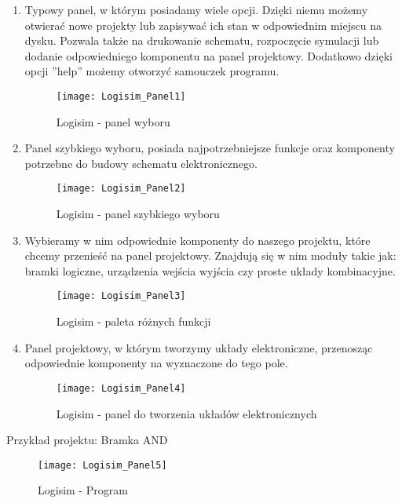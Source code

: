 \documentclass[12pt, a4paper, onside, polish]{article}				%
\begin{document}
 \begin{enumerate}
\item Typowy panel, w którym posiadamy wiele opcji. Dzięki niemu możemy otwierać nowe projekty lub zapisywać ich stan w odpowiednim miejscu na dysku. Pozwala także na drukowanie schematu, rozpoczęcie symulacji lub dodanie odpowiedniego komponentu na panel projektowy. Dodatkowo dzięki opcji ''help'' możemy otworzyć samouczek programu.
  	\begin{figure}[H]
  	  {\centering \texttt{[image: Logisim\_Panel1]} \caption{Logisim - panel wyboru}}\vspace{5mm}
  	  \end{figure}
  	  
\item  Panel szybkiego wyboru, posiada najpotrzebniejsze funkcje oraz komponenty potrzebne do budowy schematu elektronicznego.
  	\begin{figure}[H]
  	  {\centering \texttt{[image: Logisim\_Panel2]} \caption{Logisim - panel szybkiego wyboru}}\vspace{5mm}
  	  \end{figure}
  	  
 \cleardoublepage	  
\item Wybieramy w nim odpowiednie komponenty do naszego projektu, które chcemy przenieść na panel projektowy. Znajdują się w nim moduły takie jak: bramki logiczne, urządzenia wejścia wyjścia czy proste układy kombinacyjne.
  	\begin{figure}[H]
  	  {\centering \texttt{[image: Logisim\_Panel3]} \caption{Logisim - paleta różnych funkcji}}\vspace{5mm}
  	  \end{figure}
  	  
 
 \item Panel projektowy, w którym tworzymy układy elektroniczne, przenosząc odpowiednie komponenty na wyznaczone do tego pole.
  	\begin{figure}[H]
  	  {\centering \texttt{[image: Logisim\_Panel4]} \caption{Logisim -  panel do tworzenia układów elektronicznych}}\vspace{5mm}
  	  \end{figure}
 \end{enumerate}
 
  \cleardoublepage
 Przykład projektu: Bramka AND
  	\begin{figure}[H]
  	  {\centering \texttt{[image: Logisim\_Panel5]} \caption{Logisim - Program}}\vspace{5mm}
  	 \end{figure}
\end{document}

